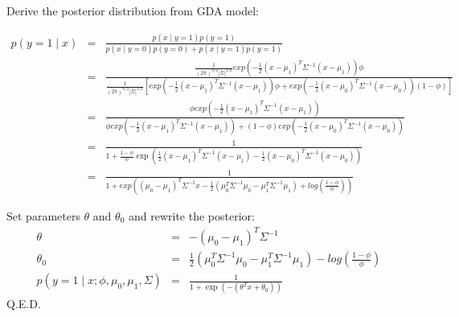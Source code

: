 \begin{answer}

Derive the posterior distribution from GDA model:

\begin{eqnarray*}
	p(y = 1\mid x)
	&=& \frac{p(x \mid y = 1) p(y = 1)}{p(x \mid y = 0) p(y = 0) + p(x \mid y = 1) p(y = 1)} \\
	&=& \frac {\frac{1}{(2\pi)^{n/2} |\Sigma|^{1/2}} exp \left( -\frac{1}{2}(x-\mu_1)^T \Sigma^{-1}(x-\mu_1)\right) \phi}
		{\frac{1}{(2\pi)^{n/2} |\Sigma|^{1/2}} \left[ exp \left( -\frac{1}{2}(x-\mu_1)^T \Sigma^{-1}(x-\mu_1)\right) \phi
		+ exp \left( -\frac{1}{2}(x-\mu_0)^T \Sigma^{-1}(x-\mu_0)\right) (1-\phi) \right ]} \\
	&=& \frac { \phi exp \left( -\frac{1}{2}(x-\mu_1)^T \Sigma^{-1}(x-\mu_1)\right)}
		{ \phi exp \left( -\frac{1}{2}(x-\mu_1)^T \Sigma^{-1}(x-\mu_1)\right)
		+ (1-\phi) exp \left( -\frac{1}{2}(x-\mu_0)^T \Sigma^{-1}(x-\mu_0)\right)} \\
	&=& \frac {1} {1 + \frac{1-\phi}{\phi} \exp \left (\frac{1}{2}(x-\mu_1)^T \Sigma^{-1}(x-\mu_1) 
		- \frac{1}{2}(x-\mu_0)^T \Sigma^{-1}(x-\mu_0) \right)} \\
	&=& \frac {1} {1 + exp \left( (\mu_0 - \mu_1)^T \Sigma^{-1} x 
		- \frac{1}{2}(\mu_0^T \Sigma^{-1}\mu_0 - \mu_1^T \Sigma^{-1}\mu_1)
		+ log (\frac{1-\phi}{\phi}) \right)}
\end{eqnarray*}

Set parameters $\theta$ and $\theta_0$ and rewrite the posterior:
\begin{eqnarray*}
	\theta &=& -(\mu_0 - \mu_1)^T \Sigma^{-1} \\
	\theta_0 &=& \frac{1}{2}(\mu_0^T \Sigma^{-1}\mu_0 - \mu_1^T \Sigma^{-1}\mu_1) - log (\frac{1-\phi}{\phi}) \\
	p(y = 1\mid x; \phi, \mu_0, \mu_1, \Sigma)
	&=& \frac{1}{1 + \exp(-(\theta^T x + \theta_0))}
\end{eqnarray*}
Q.E.D.
\end{answer}
